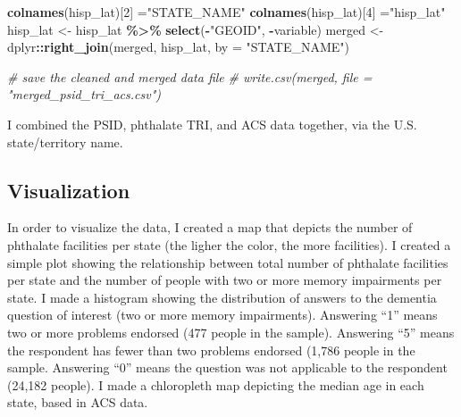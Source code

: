 \documentclass[
]{article}
\newenvironment{Shaded}{\begin{snugshade}}{\end{snugshade}}
\newcommand{\AttributeTok}[1]{\textcolor[rgb]{0.13,0.29,0.53}{#1}}
\newcommand{\CommentTok}[1]{\textcolor[rgb]{0.56,0.35,0.01}{\textit{#1}}}
\newcommand{\DecValTok}[1]{\textcolor[rgb]{0.00,0.00,0.81}{#1}}
\newcommand{\FunctionTok}[1]{\textcolor[rgb]{0.13,0.29,0.53}{\textbf{#1}}}
\newcommand{\NormalTok}[1]{#1}
\newcommand{\OtherTok}[1]{\textcolor[rgb]{0.56,0.35,0.01}{#1}}
\newcommand{\SpecialCharTok}[1]{\textcolor[rgb]{0.81,0.36,0.00}{\textbf{#1}}}
\newcommand{\StringTok}[1]{\textcolor[rgb]{0.31,0.60,0.02}{#1}}
\begin{document}
\begin{Shaded}
\begin{Highlighting}[]
\FunctionTok{colnames}\NormalTok{(hisp\_lat)[}\DecValTok{2}\NormalTok{] }\OtherTok{=}\StringTok{"STATE\_NAME"}
\FunctionTok{colnames}\NormalTok{(hisp\_lat)[}\DecValTok{4}\NormalTok{] }\OtherTok{=}\StringTok{"hisp\_lat"}
\NormalTok{hisp\_lat }\OtherTok{\textless{}{-}}\NormalTok{ hisp\_lat }\SpecialCharTok{\%\textgreater{}\%} \FunctionTok{select}\NormalTok{(}\SpecialCharTok{{-}}\StringTok{"GEOID"}\NormalTok{, }\SpecialCharTok{{-}}\NormalTok{variable)}
\NormalTok{merged }\OtherTok{\textless{}{-}}\NormalTok{ dplyr}\SpecialCharTok{::}\FunctionTok{right\_join}\NormalTok{(merged, hisp\_lat, }\AttributeTok{by =} \StringTok{"STATE\_NAME"}\NormalTok{)}

\CommentTok{\# save the cleaned and merged data file}
\CommentTok{\# write.csv(merged, file = "merged\_psid\_tri\_acs.csv")}
\end{Highlighting}
\end{Shaded}

I combined the PSID, phthalate TRI, and ACS data together, via the U.S.
state/territory name.

\hypertarget{visualization}{%
\subsection{Visualization}\label{visualization}}

In order to visualize the data, I created a map that depicts the number
of phthalate facilities per state (the ligher the color, the more
facilities). I created a simple plot showing the relationship between
total number of phthalate facilities per state and the number of people
with two or more memory impairments per state. I made a histogram
showing the distribution of answers to the dementia question of interest
(two or more memory impairments). Answering ``1'' means two or more
problems endorsed (477 people in the sample). Answering ``5'' means the
respondent has fewer than two problems endorsed (1,786 people in the
sample. Answering ``0'' means the question was not applicable to the
respondent (24,182 people). I made a chloropleth map depicting the
median age in each state, based in ACS data.
\end{document}
